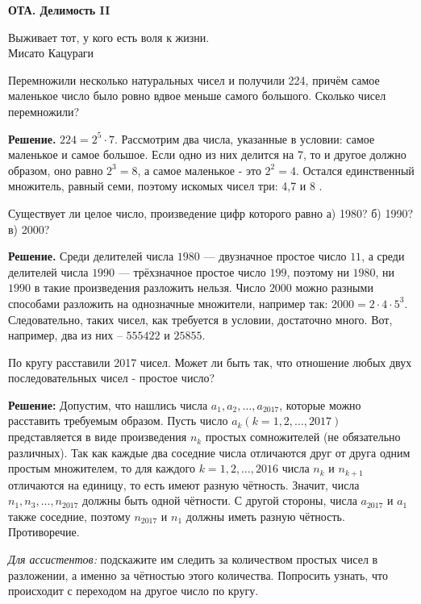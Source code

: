 \centerline{\bf \Huge ОТА. Делимость II}

\begin{flushright}
        \scriptsize{Выживает тот, у кого есть воля к жизни.\\ Мисато Кацураги}
\end{flushright}

Перемножили несколько натуральных чисел и получили 224, причём самое маленькое число было ровно вдвое меньше самого большого. Сколько чисел перемножили?

\textbf{Решение.}
$224=2^5 \cdot 7$. Рассмотрим два числа, указанные в условии: самое маленькое и самое большое. Если одно из них делится на 7, то и другое должно образом, оно равно $2^3=8$, а самое маленькое - это $2^2=4$. Остался единственный множитель, равный семи, поэтому искомых чисел три: 4,7 и 8 .

Существует ли целое число, произведение цифр которого равно  а) 1980?  б) 1990?  в) 2000?

\textbf{Решение.}
Среди делителей числа $1980$ --- двузначное простое число $11$, а среди делителей числа $1990$ --- трёхзначное простое число $199$, поэтому ни $1980$, ни $1990$ в такие произведения разложить нельзя. Число $2000$ можно разными способами разложить на однозначные множители, например так:  $2000 = 2\cdot4\cdot5^3$.  Следовательно, таких чисел, как требуется в условии, достаточно много. Вот, например, два из них – $555422$ и $25855$.

По кругу расставили 2017 чисел. Может ли быть так, что отношение любых двух последовательных чисел - простое число?

\textbf{Решение:}
Допустим, что нашлись числа $a_1, a_2, \ldots, a_{2017}$, которые можно расставить требуемым образом. Пусть число $a_k(k=1,2, \ldots, 2017)$ представляется в виде произведения $n_k$ простых сомножителей (не обязательно различных). Так как каждые два соседние числа отличаются друг от друга одним простым множителем, то для каждого $k=1,2, \ldots, 2016$ числа $n_k$ и $n_{k+1}$ отличаются на единицу, то есть имеют разную чётность. Значит, числа $n_1, n_3, \ldots, n_{2017}$ должны быть одной чётности. С другой стороны, числа $a_{2017}$ и $a_1$ также соседние, поэтому $n_{2017}$ и $n_1$ должны иметь разную чётность. Противоречие.

\textit{Для ассистентов:} подскажите им следить за количеством простых чисел в разложении, а именно за чётностью этого количества. Попросить узнать, что происходит с переходом на другое число по кругу.

